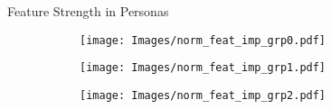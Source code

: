 
\begin{frame}{Feature Strength in Personas}

\begin{figure}[!htb]
\begin{subfigure}{.3\textwidth}
  \centering
  \texttt{[image: Images/norm\_feat\_imp\_grp0.pdf]}
\end{subfigure}%
\begin{subfigure}{.3\textwidth}
  \centering
  \texttt{[image: Images/norm\_feat\_imp\_grp1.pdf]}
\end{subfigure}
\begin{subfigure}{.3\textwidth}
  \centering
  \texttt{[image: Images/norm\_feat\_imp\_grp2.pdf]}
\end{subfigure}
\label{fig:persona_feature_strength}
\end{figure}
    
\end{frame}